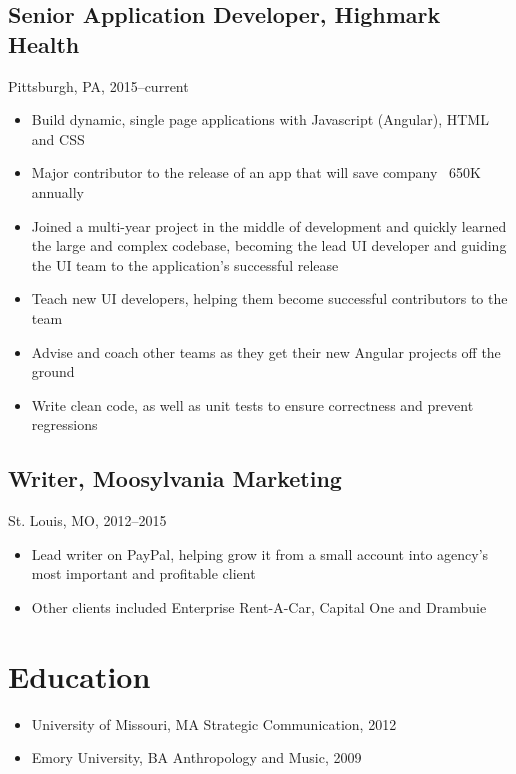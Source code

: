 \documentclass[11pt]{article}
\begin{document}
			\subsection{\normalsize{Senior Application Developer, Highmark Health}}
			{\fontsize{2pt}{\parskip} {Pittsburgh, PA, 2015--current}}
		\begin{itemize}
		\item Build dynamic, single page applications with Javascript (Angular), HTML and CSS
		\item Major contributor to the release of an app that will save company ~650K annually
		\item Joined a multi-year project in the middle of development and quickly learned the large and complex codebase, becoming the lead UI developer and guiding the UI team to the application's successful release
		\item Teach new UI developers, helping them become successful contributors to the team
		\item Advise and coach other teams as they get their new Angular projects off the ground
		\item Write clean code, as well as unit tests to ensure correctness and prevent regressions
		\end{itemize}
		
	\subsection{\normalsize{Writer, Moosylvania Marketing}}
	St. Louis, MO, 2012--2015
	\begin{itemize}
		\item Lead writer on PayPal, helping grow it from a small account into agency\rq s most important and profitable client
		\item Other clients included Enterprise Rent-A-Car, Capital One and Drambuie
	\end{itemize}
	
	\section{Education}
		\begin{itemize}
			\item University of Missouri, MA Strategic Communication, 2012
			\item Emory University, BA Anthropology and Music, 2009
					
				
		\end{itemize}
	
\end{document}
